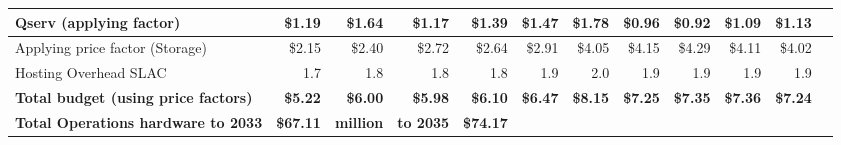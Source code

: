 \begin{longtable} { |p{}  |r  |r  |r  |r  |r  |r  |r  |r  |r  |r  |r |}
{Qserv (applying factor)}&{\$1.19}&{\$1.64}&{\$1.17}&{\$1.39}&{\$1.47}&{\$1.78}&{\$0.96}&{\$0.92}&{\$1.09}&{\$1.13} \\ \hline
{Applying price factor (Storage)}&{\$2.15}&{\$2.40}&{\$2.72}&{\$2.64}&{\$2.91}&{\$4.05}&{\$4.15}&{\$4.29}&{\$4.11}&{\$4.02} \\ \hline
{Hosting Overhead SLAC
}&{1.7}&{1.8}&{1.8}&{1.8}&{1.9}&{2.0}&{1.9}&{1.9}&{1.9}&{1.9} \\ \hline
\textbf{Total budget (using price factors)}&\textbf{\$5.22}&\textbf{\$6.00}&\textbf{\$5.98}&\textbf{\$6.10}&\textbf{\$6.47}&\textbf{\$8.15}&\textbf{\$7.25}&\textbf{\$7.35}&\textbf{\$7.36}&\textbf{\$7.24} \\ \hline
\textbf{Total Operations hardware to 2033}&\textbf{\$67.11}&\textbf{million}&\textbf{to 2035}&\textbf{\$74.17}&&&&&& \\ \hline
\end{longtable} \normalsize
